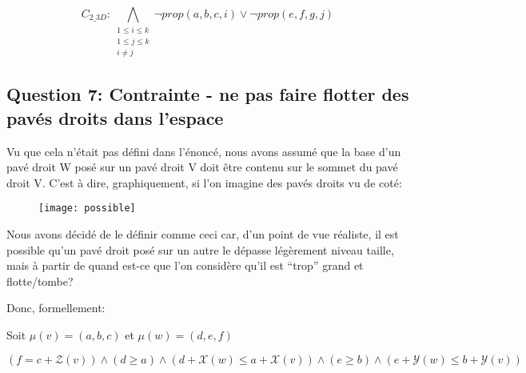 \documentclass[a4paper,10pt]{article}
\begin{document}
$$C_{2\_3D} : \bigwedge_{\substack{1 \leq i \leq k \\ 1 \leq j \leq k \\ i \neq j}} \neg prop(a,b,c,i) \lor \neg prop(e,f,g,j)$$


\newpage

\subsection{Question 7: Contrainte - ne pas faire flotter des pavés droits dans l'espace}

Vu que cela n'était pas défini dans l'énoncé, nous avons assumé que la base d'un pavé droit W posé sur un pavé droit V doit être contenu sur le sommet du pavé droit V. C'est à dire, graphiquement, si l'on imagine des pavés droits vu de coté:

\begin{figure}[htb!]
\centering
\texttt{[image: possible]}
\end{figure}

Nous avons décidé de le définir comme ceci car, d'un point de vue réaliste, il est possible qu'un pavé droit posé sur un autre le dépasse légèrement niveau taille, mais à partir de quand est-ce que l'on considère qu'il est ``trop'' grand et flotte/tombe?

Donc, formellement: 

Soit $\mu(v) = (a,b,c)$ et $\mu(w) = (d,e,f)$

$(f = c + \mathcal{Z}(v)) \land (d \geq a) \land (d+\mathcal{X}(w) \leq a+\mathcal{X}(v)) \land (e \geq b) \land(e+\mathcal{Y}(w) \leq b+\mathcal{Y}(v))$ 
\end{document}
